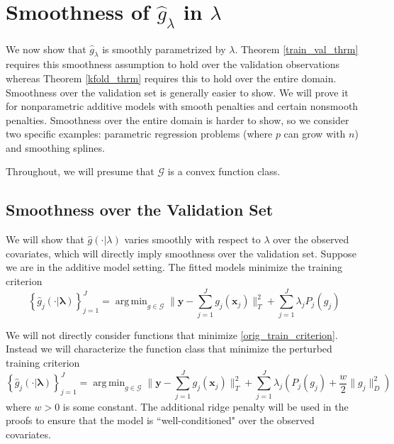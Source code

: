 \documentclass[12pt]{article}
\DeclareMathOperator*{\argmin}{arg\,min}
\begin{document}
\section{Smoothness of $\hat{g}_\lambda$ in $\lambda$}\label{sec:entropy}

We now show that $\hat{g}_\lambda$ is smoothly parametrized by $\lambda$. Theorem \ref{train_val_thrm} requires this smoothness assumption to hold over the validation observations whereas Theorem \ref{kfold_thrm} requires this to hold over the entire domain. Smoothness over the validation set is generally easier to show. We will prove it for nonparametric additive models with smooth penalties and certain nonsmooth penalties. Smoothness over the entire domain is harder to show, so we consider two specific examples: parametric regression problems (where $p$ can grow with $n$) and smoothing splines.

Throughout, we will presume that $\mathcal{G}$ is a convex function class.

\subsection{Smoothness over the Validation Set}
\label{sec:smoothness_validation}
We will show that $\hat{g}(\cdot | \lambda)$ varies smoothly with respect to $\lambda$ over the observed covariates, which will directly imply smoothness over the validation set. Suppose we are in the additive model setting. The fitted models minimize the training criterion
\begin{equation}
\label{orig_train_criterion}
\left\{ \hat{g}_j(\cdot | \boldsymbol \lambda) \right \}_{j=1}^J = \argmin_{g\in \mathcal{G}} \| \boldsymbol y -  \sum_{j=1}^J g_j(\boldsymbol x_j) \|^2_T + \sum_{j=1}^J \lambda_j P_j(g_j)
\end{equation}

We will not directly consider functions that minimize \eqref{orig_train_criterion}. Instead we will characterize the function class that minimize the perturbed training criterion
\begin{equation}
\label{train_crit_ridge}
\left\{ \hat{g}_j(\cdot | \boldsymbol \lambda) \right \}_{j=1}^J = \argmin_{g\in \mathcal{G}} \| \boldsymbol y -  \sum_{j=1}^J g_j(\boldsymbol x_j) \|^2_T + \sum_{j=1}^J \lambda_j \left ( P_j(g_j) + \frac{w}{2} \| g_j \|^2_D \right )
\end{equation}
where $w > 0$ is some constant. The additional ridge penalty will be used in the proofs to ensure that the model is ``well-conditioned" over the observed covariates.
\end{document}
